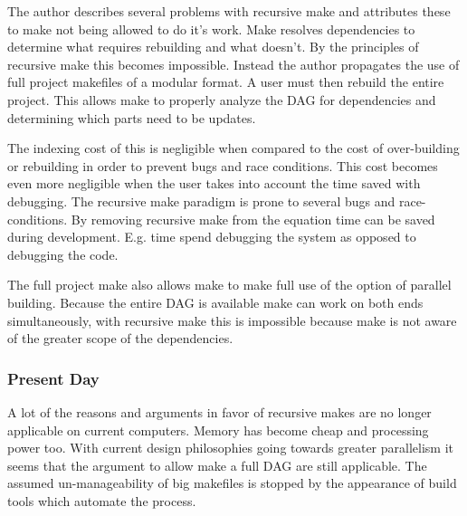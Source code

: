 The author describes several problems with recursive make and attributes these to make not being allowed to do it's work. Make resolves dependencies to determine what requires rebuilding and what doesn't. By the principles of recursive make this becomes impossible. Instead the author propagates the use of full project makefiles of a modular format. A user must then rebuild the entire project. This allows make to properly analyze the DAG for dependencies and determining which parts need to be updates.

The indexing cost of this is negligible when compared to the cost of over-building or rebuilding in order to prevent bugs and race conditions. This cost becomes even more negligible when the user takes into account the time saved with debugging. The recursive make paradigm is prone to several bugs and race-conditions. By removing recursive make from the equation time can be saved during development. E.g. time spend debugging the system as opposed to debugging the code.

The full project make also allows make to make full use of the option of parallel building. Because the entire DAG is available make can work on both ends simultaneously, with recursive make this is impossible because make is not aware of the greater scope of the dependencies.

\subsubsection{Present Day}
A lot of the reasons and arguments in favor of recursive makes are no longer applicable on current computers. Memory has become cheap and processing power too. With current design philosophies going towards greater parallelism it seems that the argument to allow make a full DAG are still applicable. The assumed un-manageability of big makefiles is stopped by the appearance of build tools which automate the process.


